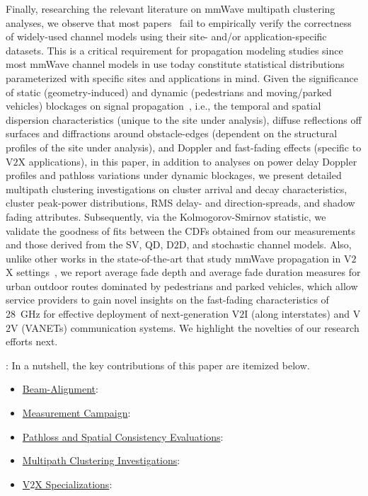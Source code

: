 \documentclass[12pt, draftcls, onecolumn]{IEEEtran}
\begin{document}
Finally, researching the relevant literature on mmWave multipath clustering analyses, we observe that most papers~\cite{Outdoor28G, PDAPs, D2DHumanBlockage, DopplerHST, V2XBlockages, MacCartneyUrbanHumanBlockage} fail to empirically verify the correctness of widely-used channel models using their site- and/or application-specific datasets. This is a critical requirement for propagation modeling studies since most mmWave channel models in use today constitute statistical distributions parameterized with specific sites and applications in mind. Given the significance of static (geometry-induced) and dynamic (pedestrians and moving/parked vehicles) blockages on signal propagation~\cite{Rappaport}, i.e., the temporal and spatial dispersion characteristics (unique to the site under analysis), diffuse reflections off surfaces and diffractions around obstacle-edges (dependent on the structural profiles of the site under analysis), and Doppler and fast-fading effects (specific to V$2$X applications), in this paper, in addition to analyses on power delay Doppler profiles and pathloss variations under dynamic blockages, we present detailed multipath clustering investigations on cluster arrival and decay characteristics, cluster peak-power distributions, RMS delay- and direction-spreads, and shadow fading attributes. Subsequently, via the Kolmogorov-Smirnov statistic, we validate the goodness of fits between the CDFs obtained from our measurements and those derived from the SV, QD, D$2$D, and stochastic channel models. Also, unlike other works in the state-of-the-art that study mmWave propagation in V$2$X settings~\cite{DopplerHST, V2XBlockages, MacCartneyUrbanHumanBlockage}, we report average fade depth and average fade duration measures for urban outdoor routes dominated by pedestrians and parked vehicles, which allow service providers to gain novel insights on the fast-fading characteristics of \SI{28}{\giga\hertz} for effective deployment of next-generation V$2$I (along interstates) and V$2$V (VANETs) communication systems. We highlight the novelties of our research efforts next.

: In a nutshell, the key contributions of this paper are itemized below.
\begin{itemize}[leftmargin=*]
    \item \underline{Beam-Alignment}:
    \item \underline{Measurement Campaign}:
    \item \underline{Pathloss and Spatial Consistency Evaluations}:
    \item \underline{Multipath Clustering Investigations}:
    \item \underline{V$2$X Specializations}:
\end{itemize}
\end{document}
